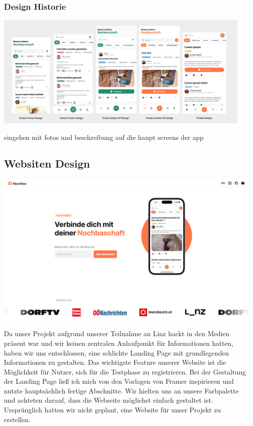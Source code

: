 \subsubsection{Design Historie}

\includegraphics[width=0.95\textwidth]{pics/app-design-history.png}

eingehen mit fotos und beschreibung auf die haupt screens der app

\subsection{Websiten Design}
\includegraphics[width=1\textwidth]{pics/website-design.png}


Da unser Projekt aufgrund unserer Teilnahme an Linz hackt in den Medien präsent war und wir keinen zentralen Anlaufpunkt für Informationen hatten, haben wir uns entschlossen, eine schlichte Landing Page mit grundlegenden Informationen zu gestalten. Das wichtigste Feature unserer Website ist die Möglichkeit für Nutzer, sich für die Testphase zu registrieren. Bei der Gestaltung der Landing Page ließ ich mich von den Vorlagen von Framer inspirieren und nutzte hauptsächlich fertige Abschnitte. Wir hielten uns an unsere Farbpalette und achteten darauf, dass die Webseite möglichst einfach gestaltet ist. Ursprünglich hatten wir nicht geplant, eine Website für unser Projekt zu erstellen.

